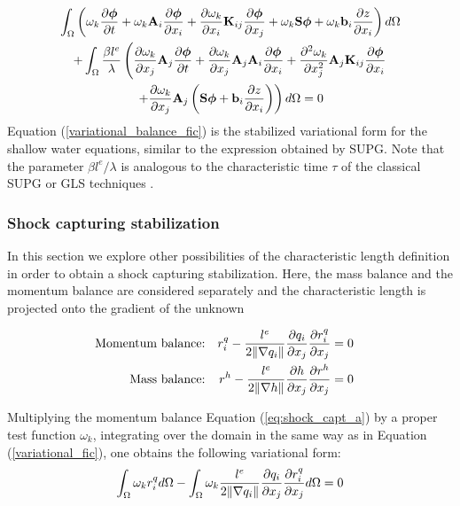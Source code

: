 \begin{multline} \label{variational_balance_fic}
\int_\Omega \left(
    \omega_k \frac{\partial\bm{\phi}}{\partial t} + \omega_k \mathbf{A}_i\frac{\partial\bm{\phi}}{\partial x_i}
    + \frac{\partial\omega_k}{\partial x_i} \mathbf{K}_{ij} \frac{\partial\bm{\phi}}{\partial x_j} + \omega_k \mathbf{S}\bm{\phi} + \omega_k \mathbf{b}_i\frac{\partial z}{\partial x_i}
\right) d\Omega\\ +
\int_\Omega \frac{\beta l^e}{\lambda} \left(
    \frac{\partial\omega_k}{\partial x_j} \mathbf{A}_j \frac{\partial\bm{\phi}}{\partial t}
    + \frac{\partial\omega_k}{\partial x_j} \mathbf{A}_j\mathbf{A}_i\frac{\partial\bm{\phi}}{\partial x_i}
    + \frac{\partial^2\omega_k}{\partial x_j^2} \mathbf{A}_j\mathbf{K}_{ij} \frac{\partial\bm{\phi}}{\partial x_i} \right. \\
    \left.
    + \frac{\partial\omega_k}{\partial x_j} \mathbf{A}_j \left( \mathbf{S}\bm{\phi} + \mathbf{b}_i\frac{\partial z}{\partial x_i} \right)
\right) d\Omega
=0
\end{multline}
Equation (\ref{variational_balance_fic}) is the stabilized variational form for the shallow water equations, similar to the expression obtained by SUPG. Note that the parameter $\beta l^e/\lambda$ is analogous to the characteristic time $\tau$ of the classical SUPG or GLS techniques \cite{cotela2016}.




\subsubsection{Shock capturing stabilization}

In this section we explore other possibilities of the characteristic length definition in order to obtain a shock capturing stabilization. Here, the mass balance and the momentum balance are considered separately and the characteristic length is projected onto the gradient of the unknown

\begin{subequations} \label{eq:shock_capt}
\begin{align}
\text{Momentum balance:} &&
    r_i^q - \frac{l^e}{2\lVert\nabla q_i\rVert}\frac{\partial q_i}{\partial x_j}\frac{\partial r_i^q}{\partial x_j} &= 0 \label{eq:shock_capt_a} && \\ 
\text{Mass balance:} &&
    r^h - \frac{l^e}{2\lVert\nabla h\rVert} \frac{\partial h}{\partial x_j} \frac{\partial r^h}{\partial x_j} &=0 \label{eq:shock_capt_b}
\end{align}
\end{subequations}

Multiplying the momentum balance Equation (\ref{eq:shock_capt_a}) by a proper test function $\omega_k$, integrating over the domain in the same way as in Equation (\ref{variational_fic}),
one obtains the following variational form:
\begin{equation}
    \int_\Omega \omega_k r_i^q d\Omega
     - \int_\Omega \omega_k \frac{l^e}{2\lVert\nabla q_i\rVert}\frac{\partial q_i}{\partial x_j}\frac{\partial r_i^q}{\partial x_j}
     d\Omega = 0
    \label{partial_variational_shock_capt}
\end{equation}


